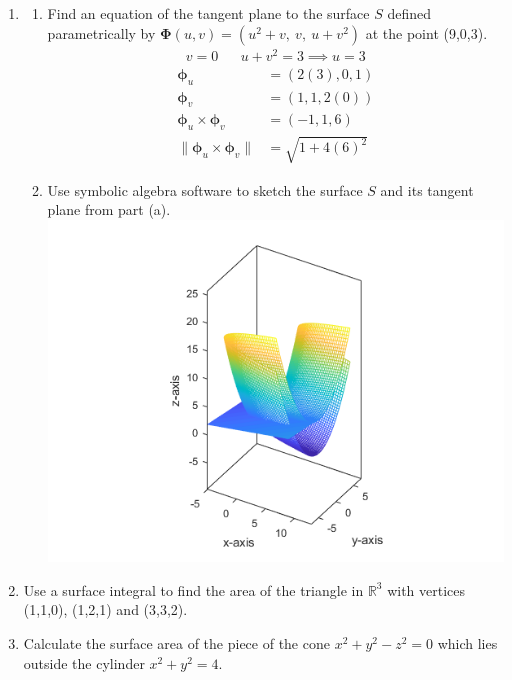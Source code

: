 \documentclass{article}
\newcommand{\norm}[1]{\| #1 \|}
\begin{document}
\thispagestyle{fancy}

\begin{enumerate}
    \item
    \begin{enumerate}
        \item Find an equation of the tangent plane to the surface $S$ defined parametrically by $\boldsymbol \Phi(u, v) = (u^2 + v,\ v,\ u+v^2)$ at the point (9,0,3).
        \begin{align*}
            &v = 0 & &u + v^2 = 3 \implies u = 3&
        \end{align*}
        \begin{align*}
            \boldsymbol \phi_u &= (2(3), 0, 1) \\
            \boldsymbol \phi_v &= (1,1,2(0)) \\
            \boldsymbol \phi_u \times \boldsymbol \phi_v &= (-1,1,6) \\
            \norm{\boldsymbol \phi_u \times \boldsymbol \phi_v} &= \sqrt{1 + 4(6)^2}
        \end{align*}
        \item Use symbolic algebra software to sketch the surface $S$ and its tangent plane from part (a).
        \includegraphics[width=\textwidth]{b42-a7-1b}
    \end{enumerate}

    \item Use a surface integral to find the area of the triangle in $\mathbb{R}^3$ with vertices (1,1,0), (1,2,1) and (3,3,2).

    \item Calculate the surface area of the piece of the cone $x^2+y^2-z^2 =0$ which lies outside the cylinder $x^2 + y^2 = 4$.


\end{enumerate}
\end{document}
